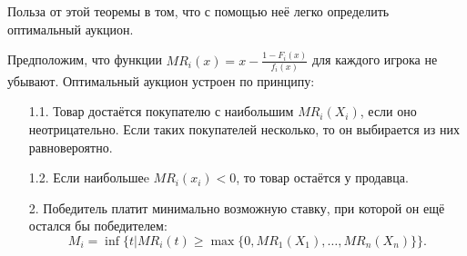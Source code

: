 Польза от этой теоремы в том, что с помощью неё легко определить оптимальный аукцион.


\begin{myth}
\label{th:optimal_structure}
Предположим, что функции $ MR_{i}(x)=x-\frac{1-F_{i}(x)}{f_{i}(x)} $ для каждого игрока не убывают. Оптимальный аукцион устроен по принципу:
\begin{itemize}
\item[1.1.] Товар достаётся покупателю с наибольшим $ MR_{i}(X_{i}) $, если оно неотрицательно. Если таких покупателей несколько, то он выбирается из них равновероятно.
\item[1.2.] Если наибольшеe $ MR_{i}(x_{i})<0 $, то товар остаётся у продавца.
\item[2.] Победитель платит минимально возможную ставку, при которой он ещё остался бы победителем:
\begin{equation}
M_{i}=\inf\{ t| MR_{i}(t)\geq \max\{0, MR_{1}(X_{1}), \ldots, MR_n(X_n) \} \}.
\end{equation}
\end{itemize}
\end{myth}

